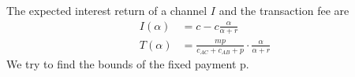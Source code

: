 \documentclass[12pt]{article}
\theoremstyle{plain}
\newtheorem{assumption}{Assumption}
\theoremstyle{remark}
\newtheorem{remark}{Remark}
\theoremstyle{definition}
\begin{document}





The expected interest return of a channel $I$ and the transaction fee are 
\begin{align}
    I(\alpha) &= c-c\frac{\alpha}{\alpha + r}\\
    T(\alpha) &= \frac{mp}{c_{AC}+c_{AB}+p} \cdot \frac{\alpha}{\alpha + r}
\end{align}
We try to find the bounds of the fixed payment p. 
\end{document}
